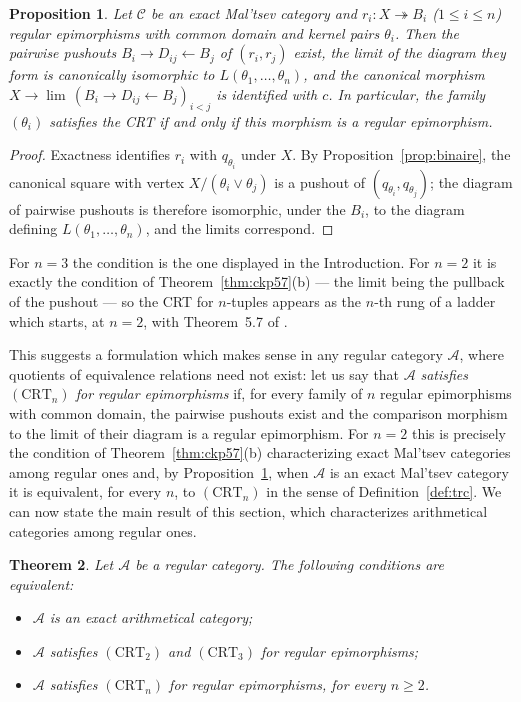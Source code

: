 \documentclass[11pt,a4paper]{article}
\theoremstyle{plain}
\newtheorem{theoreme}{Theorem}[section]
\newtheorem{proposition}[theoreme]{Proposition}
\theoremstyle{definition}
\theoremstyle{remark}
\theoremstyle{plain}
\newcommand{\C}{\mathcal{C}}
\begin{document}
\begin{proposition}\label{prop:diag}
Let $\C$ be an exact Mal'tsev category and
$r_i \colon X \twoheadrightarrow B_i$ ($1 \le i \le n$) regular
epimorphisms with common domain and kernel pairs $\theta_i$. Then the
pairwise pushouts $B_i \to D_{ij} \leftarrow B_j$ of $(r_i, r_j)$ exist,
the limit of the diagram they form is canonically isomorphic to
$L(\theta_1,\dots,\theta_n)$, and the canonical morphism
$X \to \lim\,(B_i \to D_{ij} \leftarrow B_j)_{i<j}$ is identified with $c$.
In particular, the family $(\theta_i)$ satisfies the CRT if and only if
this morphism is a regular epimorphism.
\end{proposition}

\begin{proof}
Exactness identifies $r_i$ with $q_{\theta_i}$ under $X$. By
Proposition~\ref{prop:binaire}, the
canonical square with vertex $X/(\theta_i \vee \theta_j)$ is a pushout of
$(q_{\theta_i}, q_{\theta_j})$; the diagram of pairwise pushouts is
therefore isomorphic, under the $B_i$, to the diagram defining
$L(\theta_1,\dots,\theta_n)$, and the limits correspond.
\end{proof}

For $n = 3$ the condition is the one displayed in the Introduction. For
$n = 2$ it is exactly the condition of
Theorem~\ref{thm:ckp57}(b) --- the limit being the pullback of the
pushout --- so the CRT for $n$-tuples appears as the 
$n$-th rung of a ladder which starts, at 
$n=2$, with Theorem~5.7 of \cite{CKP}.

This suggests a formulation which makes sense in any regular category
$\mathcal{A}$, where quotients of equivalence relations need not exist: let us say
that $\mathcal{A}$ \emph{satisfies $(\mathrm{CRT}_n)$ for regular
epimorphisms} if, for every family of $n$ regular epimorphisms with common
domain, the pairwise pushouts exist and the comparison morphism to the
limit of their diagram is a regular epimorphism. For $n = 2$ this is
precisely the condition of Theorem~\ref{thm:ckp57}(b) characterizing exact
Mal'tsev categories among regular ones and, by
Proposition~\ref{prop:diag}, when $\mathcal{A}$ is an exact Mal'tsev
category it is equivalent, for every $n$, to $(\mathrm{CRT}_n)$ in the
sense of Definition~\ref{def:trc}. We can now state the main result of
this section, which characterizes arithmetical categories among regular
ones.

\begin{theoreme}\label{thm:main}
Let $\mathcal{A}$ be a regular category. The following conditions are
equivalent:
\begin{itemize}
\item[(i)] $\mathcal{A}$ is an exact arithmetical category;
\item[(ii)] $\mathcal{A}$ satisfies $(\mathrm{CRT}_2)$ and
$(\mathrm{CRT}_3)$ for regular epimorphisms;
\item[(iii)] $\mathcal{A}$ satisfies $(\mathrm{CRT}_n)$ for regular
epimorphisms, for every $n \ge 2$.
\end{itemize}
\end{theoreme}
\end{document}
